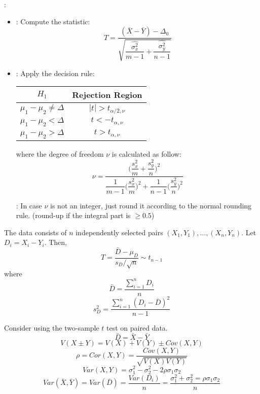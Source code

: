 \begin{multicols}{3}
    \par {}:
    \begin{itemize}
      \item {}: Compute the statistic:
        \[
          T = \frac{(\bar{X} - \bar{Y}) - \Delta_0}{
                \sqrt{\dfrac{\hat{\sigma_x^2}}{m - 1}
                    + \dfrac{\hat{\sigma_y^2}}{n - 1}}}
        \]
      \item {}: Apply the decision rule:
      \begin{center}
      \begin{tabular}{|c|c|}
        \hline
        \textbf{$H_1$}              & \textbf{Rejection Region} \\ \hline
        $\mu_1 - \mu_2 \neq \Delta$ & $|t| > t_{\alpha/2, \nu}$ \\ \hline
        $\mu_1 - \mu_2 < \Delta$    & $t < -t_{\alpha, \nu}$    \\ \hline
        $\mu_1 - \mu_2 > \Delta$    & $t > t_{\alpha, \nu}$     \\ \hline
        \end{tabular}
      \end{center}
      where the degree of freedom $\nu$ is calculated as follow:
        \[
          \nu = \frac{\bigg(\dfrac{s_x^2}{m} + \dfrac{s_y^2}{n}\bigg)^2}
                     {
                       \dfrac{1}{m - 1} \bigg(\dfrac{s_x^2}{m}\bigg)^2
                      + \dfrac{1}{n - 1} \bigg(\dfrac{s_y^2}{n}\bigg)^2
                     }
        \]
        \par {}: In case $\nu$ is not an integer, just round it according to the normal rounding rule. (round-up if the integral part is $\geq 0.5$)
    \end{itemize}

    \par The data consists of $n$ independently selected pairs $(X_1, Y_1), \ldots, (X_n, Y_n)$. Let $D_i = X_i - Y_i$. Then,
      \[
        T = \frac{\bar{D} - \mu_{D}}{s_{D} / \sqrt{n}} \sim t_{n - 1}
      \]
      where
      \[
        \bar{D} = \frac{\sum\limits_{i = 1}^{n} D_i}{n}
      \]
      \[
        s_D^2 = \frac{\sum\limits_{i = 1}^{n} (D_i - \bar{D})^2}{n - 1}
      \]

      \par Consider using the two-sample $t$ test on paired data.
      \[
        \bar{D} = \bar{X} - \bar{Y}
      \]
      \[
        V(X \pm Y) = V(X) + V(Y) \pm Cov(X, Y)
      \]
      \[
        \rho = Cor(X, Y) = \frac{Cov(X, Y)}{\sqrt{V(X)V(Y)}}
      \]
      \[
        Var(X, Y) = \sigma_1^2 - \sigma_2^2 - 2 \rho \sigma_1 \sigma_2
      \]
      \[
        Var(\bar{X}, \bar{Y}) = Var(\bar{D}) = \frac{Var(D_i)}{n} = \frac{\sigma_1^2 + \sigma_2^2 = \rho \sigma_1 \sigma_2}{n}
      \]


\end{multicols}
